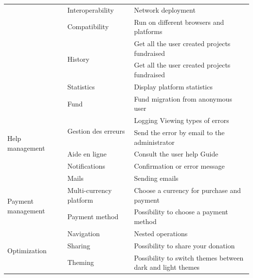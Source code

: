 \begin{longtable}{|m{10em}|m{10em}|m{10em}|}
                                           & \multirow{1}{*}{Interoperability}        & Network deployment                                         \\\cline{2-3}
                                           & \multirow{1}{*}{Compatibility}           & Run on different browsers and platforms                    \\\cline{2-3}
                                           & \multirow{2}{*}{History}                 & Get all the user created projects fundraised               \\\cline{3-3}
                                           &                                          & Get all the user created projects fundraised               \\\cline{2-3}
                                           & \multirow{1}{*}{Statistics}              & Display platform statistics                                \\\cline{2-3}
                                           & \multirow{1}{*}{Fund}                    & Fund migration from anonymous user                         \\\hline
      \multirow{4}{*}{Help management}     & \multirow{2}{*}{Gestion des erreurs}     & Logging Viewing types of errors                            \\\cline{3-3}
                                           &                                          & Send the error by email to the administrator               \\\cline{2-3}
                                           & \multirow{1}{*}{Aide en ligne}           & Consult the user help Guide                                \\\cline{2-3}
                                           & \multirow{1}{*}{Notifications}           & Confirmation or error message                              \\\cline{2-3}
                                           & \multirow{1}{*}{Mails}                   & Sending emails                                             \\\hline
      \multirow{2}{*}{Payment management}  & \multirow{1}{*}{Multi-currency platform} & Choose a currency for purchase and payment                 \\\cline{2-3}
                                           & \multirow{1}{*}{Payment method}          & Possibility to choose a payment method                     \\\hline
      \multirow{3}{*}{Optimization}        & \multirow{1}{*}{Navigation}              & Nested operations                                          \\\cline{2-3}
                                           & \multirow{1}{*}{Sharing}                 & Possibility to share your donation                         \\\cline{2-3}
                                           & \multirow{1}{*}{Theming}                 & Possibility to switch themes between dark and light themes \\\hline


\end{longtable}
